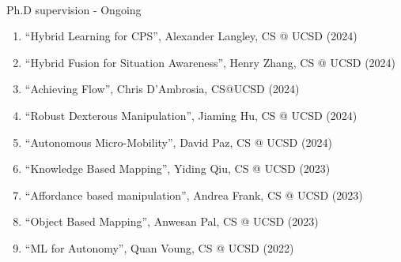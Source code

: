 \documentclass{article}
\begin{document}
\begin{cv}


\begin{cvlist}{~}

\item[Ph.D supervision - Ongoing]\ \\
  \begin{enumerate}
  \item ``Hybrid Learning for CPS'', Alexander Langley, CS @ UCSD (2024)
  \item ``Hybrid Fusion for Situation Awareness'', Henry Zhang, CS @  UCSD (2024)
  \item ``Achieving Flow'', Chris D'Ambrosia, CS@UCSD (2024)
  \item ``Robust Dexterous Manipulation'', Jiaming Hu, CS @ UCSD (2024)
  \item ``Autonomous Micro-Mobility'', David Paz, CS @ UCSD (2024)
  \item ``Knowledge Based Mapping'', Yiding Qiu, CS @ UCSD (2023)
  \item ``Affordance based manipulation'', Andrea Frank, CS @ UCSD (2023)
  \item ``Object Based Mapping'', Anwesan Pal, CS @ UCSD (2023)
  \item ``ML for Autonomy'', Quan Voung, CS @ UCSD (2022)
  \end{enumerate}


\end{cvlist}
\end{cv}
\end{document}
